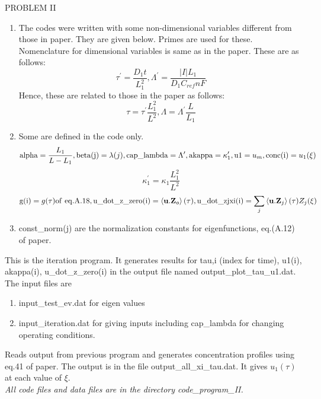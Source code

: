 \documentclass[a4paper,11pt]{article}
\begin{document}
\vspace{0.1in}

\begin{center}
  PROBLEM II
\end{center}


\begin{enumerate}
\item The codes were written with some non-dimensional variables different
  from those in paper. They are given below. Primes are used for these. Nomenclature for
  dimensional variables is same as in the paper.  These are as follows:
  \[\tau^\prime= \frac{D_1
    t}{L_1^2},\Lambda^\prime=\frac{|I|L_1}{D_1C_{ref}nF}\]
  Hence, these are related to those in the paper as follows:
  \[\tau=\tau^\prime\frac{L^2_1}{L^2}, \Lambda=\Lambda^\prime\frac{L}{L_1}\]
\item   Some are defined in the code only.
 \[{\rm alpha}=\frac{L_1}{L-L_1}, {\rm beta(j)}=\lambda(j), {\rm cap\_lambda}=\Lambda^\prime, {\rm akappa}=\kappa_1^\prime,{\rm u1}=u_m, {\rm conc(i)}=u_1(\xi) \]
\[\kappa_1^\prime=\kappa_1\frac{L_1^2}{L^2}\]
 \[{\rm g(i)}=g(\tau) {\rm of\,\, eq.A.18}, {\rm
  u\_dot\_z\_zero(i)}=\left<{\bf u.Z}_o\right>(\tau),{\rm
  u\_dot\_zjxi(i)}=\sum_j\left<{\bf u.Z}_j\right>(\tau)Z_j(\xi)\]
\item const\_norm(j) are the normalization constants for
eigenfunctions, eq.(A.12) of paper.
\end{enumerate}
\vspace{.1in}


This is the iteration program. It generates results for
tau,i (index for time), u1(i), akappa(i), u\_dot\_z\_zero(i)  in the output file named
  output\_plot\_tau\_u1.dat. The input files are
  \begin{enumerate}
    \item input\_test\_ev.dat for eigen values
\item input\_iteration.dat for giving inputs including cap\_lambda for
  changing operating conditions.
\end{enumerate}

  Reads output from previous program and generates concentration
  profiles using eq.41 of paper. The output is in the file 
output\_all\_xi\_tau.dat. It gives $u_1(\tau)$ at each value of $\xi$.\\


{\it All  code files  and data files are in the directory code\_program\_II.}
\end{document}
